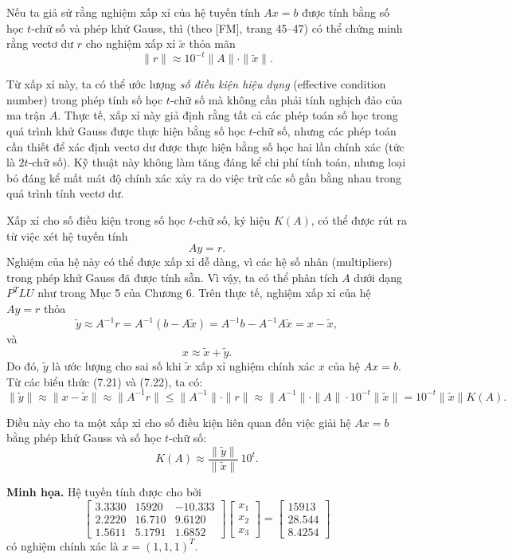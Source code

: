 Nếu ta giả sử rằng nghiệm xấp xỉ của hệ tuyến tính \( A x = b \) 
được tính bằng số học \( t \)-chữ số và phép khử Gauss, 
thì (theo [FM], trang 45–47) có thể chứng minh rằng vectơ dư \( r \) cho nghiệm xấp xỉ \( \tilde{x} \) thỏa mãn
\[
\|r\| \approx 10^{-t} \|A\| \cdot \|\tilde{x}\|.
\tag{7.21}
\]

Từ xấp xỉ này, ta có thể ước lượng \textit{số điều kiện hiệu dụng} (effective condition number) 
trong phép tính số học \( t \)-chữ số mà không cần phải tính nghịch đảo của ma trận \( A \).  
Thực tế, xấp xỉ này giả định rằng tất cả các phép toán số học trong quá trình khử Gauss 
được thực hiện bằng số học \( t \)-chữ số, 
nhưng các phép toán cần thiết để xác định vectơ dư được thực hiện bằng số học hai lần chính xác 
(tức là \( 2t \)-chữ số).  
Kỹ thuật này không làm tăng đáng kể chi phí tính toán, 
nhưng loại bỏ đáng kể mất mát độ chính xác xảy ra do việc trừ các số gần bằng nhau 
trong quá trình tính vectơ dư.

Xấp xỉ cho số điều kiện trong số học \( t \)-chữ số, ký hiệu \( K(A) \), 
có thể được rút ra từ việc xét hệ tuyến tính
\[
A y = r.
\]
Nghiệm của hệ này có thể được xấp xỉ dễ dàng, 
vì các hệ số nhân (multipliers) trong phép khử Gauss đã được tính sẵn.  
Vì vậy, ta có thể phân tích \( A \) dưới dạng \( P^T L U \) như trong Mục 5 của Chương 6.  
Trên thực tế, nghiệm xấp xỉ của hệ \( A y = r \) thỏa
\[
\tilde{y} \approx A^{-1} r = A^{-1}(b - A\tilde{x}) = A^{-1}b - A^{-1}A\tilde{x} = x - \tilde{x},
\tag{7.22}
\]
và
\[
x \approx \tilde{x} + \tilde{y}.
\]
Do đó, \( \tilde{y} \) là ước lượng cho sai số khi \( \tilde{x} \) xấp xỉ nghiệm chính xác \( x \) của hệ \( A x = b \).  
Từ các biểu thức (7.21) và (7.22), ta có:
\[
\|\tilde{y}\| \approx \|x - \tilde{x}\| \approx \|A^{-1} r\| 
\leq \|A^{-1}\| \cdot \|r\| 
\approx \|A^{-1}\| \cdot \|A\| \cdot 10^{-t} \|\tilde{x}\| 
= 10^{-t} \|\tilde{x}\| K(A).
\]

Điều này cho ta một xấp xỉ cho số điều kiện liên quan đến việc giải hệ \( A x = b \)
bằng phép khử Gauss và số học \( t \)-chữ số:
\[
K(A) \approx \frac{\|\tilde{y}\|}{\|\tilde{x}\|} \, 10^{t}.
\tag{7.23}
\]

\textbf{Minh họa.}  
Hệ tuyến tính được cho bởi
\[
\begin{bmatrix}
3.3330 & 15920 & -10.333 \\
2.2220 & 16.710 & 9.6120 \\
1.5611 & 5.1791 & 1.6852
\end{bmatrix}
\begin{bmatrix}
x_1 \\ x_2 \\ x_3
\end{bmatrix}
=
\begin{bmatrix}
15913 \\ 28.544 \\ 8.4254
\end{bmatrix}
\]
có nghiệm chính xác là \( x = (1, 1, 1)^T \).

